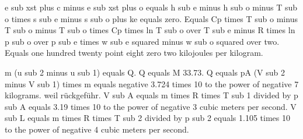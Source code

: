 e sub xst plus c minus e sub xst plus o equals h sub e minus h sub o minus T sub o times s sub e minus s sub o plus ke equals zero.  
Equals Cp times T sub o minus T sub o minus T sub o times Cp times ln T sub o over T sub e minus R times ln p sub o over p sub e times w sub e squared minus w sub o squared over two.  
Equals one hundred twenty point eight zero two kilojoules per kilogram.

m (u sub 2 minus u sub 1) equals Q. Q equals M 33.73. Q equals pA (V sub 2 minus V sub 1) times m equals negative 3.724 times 10 to the power of negative 7 kilograms. weil rückgeführ. V sub A equals m times R times T sub 1 divided by p sub A equals 3.19 times 10 to the power of negative 3 cubic meters per second. V sub L equals m times R times T sub 2 divided by p sub 2 equals 1.105 times 10 to the power of negative 4 cubic meters per second.